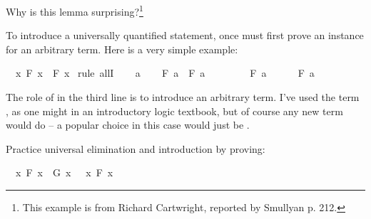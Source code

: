 \begin{isabellebody}
%
\isadelimproof
%
\endisadelimproof
%
\begin{isamarkuptext}%
Why is this lemma surprising?\footnote{This example is from Richard Cartwright, reported by
Smullyan \cite{smullyan_what_1978} p. 212.}%
\end{isamarkuptext}\isamarkuptrue%
%
\isamarkuptrue%
%
\begin{isamarkuptext}%
To introduce a universally quantified statement, once must first prove an instance for an
arbitrary term. Here is a very simple example:%
\end{isamarkuptext}\isamarkuptrue%
\isamarkupfalse%
\ {\isachardoublequoteopen}{\isasymforall}\ x{\isachardot}\ F\ x\ {\isasymlongrightarrow}\ F\ x{\isachardoublequoteclose}\isanewline
%
\isadelimproof
%
\endisadelimproof
%
\isatagproof
{}\isamarkupfalse%
\ {\isacharparenleft}rule\ allI{\isacharparenright}\isanewline
\ \ \isamarkupfalse%
\ a\isanewline
\ \ \isamarkupfalse%
\ {\isachardoublequoteopen}F\ a\ {\isasymlongrightarrow}\ F\ a{\isachardoublequoteclose}\isanewline
\ \ \isamarkupfalse%
\isanewline
\ \ \ \ \isamarkupfalse%
\ {\isachardoublequoteopen}F\ a{\isachardoublequoteclose}\isanewline
\ \ \ \ \isamarkupfalse%
\ {\isachardoublequoteopen}F\ a{\isachardoublequoteclose}\isacommand{{\isachardot}}\isamarkupfalse%
\isanewline
\ \ \isamarkupfalse%
\isanewline
{}\isamarkupfalse%
%
\endisatagproof
{\isafoldproof}%
%
\isadelimproof
%
\endisadelimproof
%
\begin{isamarkuptext}%
The role of  in the third line is to introduce an arbitrary term. I've used the
term , as one might in an introductory logic textbook, but of course any new term would do 
-- a popular choice in this case would just be .%
\end{isamarkuptext}\isamarkuptrue%
%
\begin{isamarkuptext}%
\begin{Exercise} Practice universal elimination and introduction by proving: \end{Exercise}%
\end{isamarkuptext}\isamarkuptrue%
\isamarkupfalse%
\ {\isachardoublequoteopen}{\isacharparenleft}{\isasymforall}\ x{\isachardot}\ F\ x\ {\isasymand}\ G\ x{\isacharparenright}\ {\isasymlongrightarrow}\ {\isacharparenleft}{\isasymforall}\ x{\isachardot}\ F\ x{\isacharparenright}{\isachardoublequoteclose}%

\end{isabellebody}
